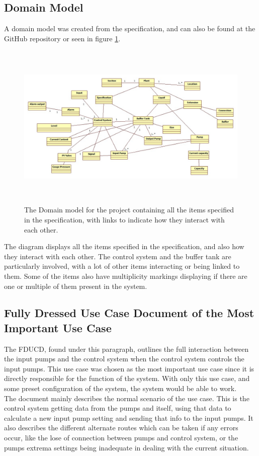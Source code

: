 \documentclass[11pt, A4paper, english]{article}
\begin{document}
		\subsection{Domain Model}
A domain model was created from the specification, and can also be found at the GitHub repository or seen in figure \ref{im:DM}.
			\begin{figure}[H]
\includegraphics[width=12.8cm, height=8cm]{Domain Model.jpg}
\caption{The Domain model for the project containing all the items specified in the specification, with links to indicate how they interact with each other.}
\label{im:DM}
			\end{figure}
The diagram displays all the items specified in the specification, and also how they interact with each other. The control system and the buffer tank are particularly involved, with a lot of other items interacting or being linked to them. Some of the items also have multiplicity markings displaying if there are one or multiple of them present in the system.

		\subsection{Fully Dressed Use Case Document of the Most Important Use Case}
The FDUCD, found under this paragraph, outlines the full interaction between the input pumps and the control system when the control system controls the input pumps. This use case was chosen as the most important use case since it is directly responsible for the function of the system. With only this use case, and some preset configuration of the system, the system would be able to work. \\
The document mainly describes the normal scenario of the use case. This is the control system getting data from the pumps and itself, using that data to calculate a new input pump setting and sending that info to the input pumps. It also describes the different alternate routes which can be taken if any errors occur, like the lose of connection between pumps and control system, or the pumps extrema settings being inadequate in dealing with the current situation. \\

		
\end{document}
